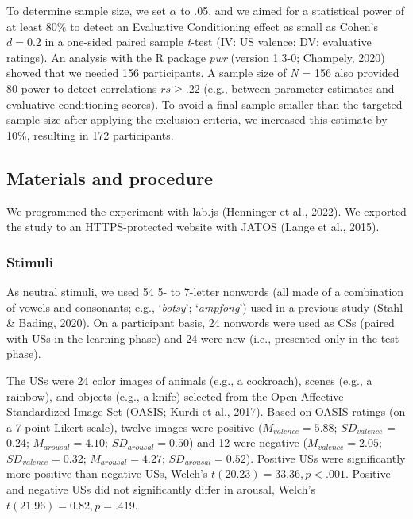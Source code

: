 \documentclass[
  man,floatsintext]{apa6}
\begin{document}
To determine sample size, we set \(\alpha\) to .05, and we aimed for a statistical power of at least \(80\%\) to detect an Evaluative Conditioning effect as small as Cohen's \(d = 0.2\) in a one-sided paired sample \emph{t}-test (IV: US valence; DV: evaluative ratings). An analysis with the R package \emph{pwr} (version 1.3-0; Champely, 2020) showed that we needed 156 participants. A sample size of \emph{N} = 156 also provided \(80%
\) power to detect correlations \(rs \geq .22\) (e.g., between parameter estimates and evaluative conditioning scores). To avoid a final sample smaller than the targeted sample size after applying the exclusion criteria, we increased this estimate by 10\%, resulting in 172 participants.

\hypertarget{materials-and-procedure}{%
\subsection{Materials and procedure}\label{materials-and-procedure}}

We programmed the experiment with lab.js (Henninger et al., 2022). We exported the study to an HTTPS-protected website with JATOS (Lange et al., 2015).

\hypertarget{stimuli}{%
\subsubsection{Stimuli}\label{stimuli}}

As neutral stimuli, we used 54 5- to 7-letter nonwords (all made of a combination of vowels and consonants; e.g., `\emph{botsy}'; `\emph{ampfong}') used in a previous study (Stahl \& Bading, 2020). On a participant basis, 24 nonwords were used as CSs (paired with USs in the learning phase) and 24 were new (i.e., presented only in the test phase).

The USs were 24 color images of animals (e.g., a cockroach), scenes (e.g., a rainbow), and objects (e.g., a knife) selected from the Open Affective Standardized Image Set (OASIS; Kurdi et al., 2017). Based on OASIS ratings (on a 7-point Likert scale), twelve images were positive (\(M_{valence} = 5.88\); \(SD_{valence}\) = 0.24; \(M_{arousal} = 4.10\); \(SD_{arousal} = 0.50\)) and 12 were negative (\(M_{valence} = 2.05\); \(SD_{valence} = 0.32\); \(M_{arousal} = 4.27\); \(SD_{arousal} = 0.52\)). Positive USs were significantly more positive than negative USs, Welch's \(t(20.23) = 33.36, p < .001\). Positive and negative USs did not significantly differ in arousal, Welch's \(t(21.96) = 0.82, p = .419\).
\end{document}
